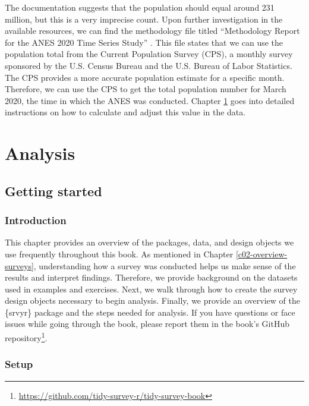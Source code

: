 \documentclass[
]{krantz}
\renewcommand{\href}[2]{#2\footnote{\url{#1}}}
\begin{document}
The documentation suggests that the population should equal around 231 million, but this is a very imprecise count. Upon further investigation in the available resources, we can find the methodology file titled ``Methodology Report for the ANES 2020 Time Series Study'' \citep{anes-2020-tech}. This file states that we can use the population total from the Current Population Survey (CPS), a monthly survey sponsored by the U.S. Census Bureau and the U.S. Bureau of Labor Statistics. The CPS provides a more accurate population estimate for a specific month. Therefore, we can use the CPS to get the total population number for March 2020, the time in which the ANES was conducted. Chapter \ref{c04-getting-started} goes into detailed instructions on how to calculate and adjust this value in the data.

\hypertarget{part-analysis}{%
\part{Analysis}\label{part-analysis}}

\hypertarget{c04-getting-started}{%
\chapter{Getting started}\label{c04-getting-started}}

\hypertarget{introduction-3}{%
\section{Introduction}\label{introduction-3}}

This chapter provides an overview of the packages, data, and design objects we use frequently throughout this book. As mentioned in Chapter \ref{c02-overview-surveys}, understanding how a survey was conducted helps us make sense of the results and interpret findings. Therefore, we provide background on the datasets used in examples and exercises. Next, we walk through how to create the survey design objects necessary to begin analysis. Finally, we provide an overview of the \{srvyr\} package and the steps needed for analysis. If you have questions or face issues while going through the book, please report them in the book's \href{https://github.com/tidy-survey-r/tidy-survey-book}{GitHub repository}.

\hypertarget{setup}{%
\section{Setup}\label{setup}}
\end{document}
